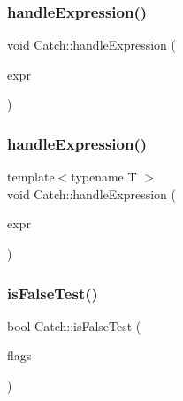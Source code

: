 \mbox{\label{namespace_catch_a65af25091f2ab61056e166765963e525}} 
\subsubsection{\texorpdfstring{handle\+Expression()}{handleExpression()}\hspace{0.1cm}{\footnotesize\ttfamily [1/2]}}
{\footnotesize\ttfamily void Catch\+::handle\+Expression (\begin{DoxyParamCaption}\item[{\mbox{\hyperlink{struct_catch_1_1_i_transient_expression}{I\+Transient\+Expression}} const \&}]{expr }\end{DoxyParamCaption})}

\mbox{\label{namespace_catch_af2c93db76668a981e75ae835699efce7}} 
\subsubsection{\texorpdfstring{handle\+Expression()}{handleExpression()}\hspace{0.1cm}{\footnotesize\ttfamily [2/2]}}
{\footnotesize\ttfamily template$<$typename T $>$ \\
void Catch\+::handle\+Expression (\begin{DoxyParamCaption}\item[{\mbox{\hyperlink{class_catch_1_1_expr_lhs}{Expr\+Lhs}}$<$ T $>$ const \&}]{expr }\end{DoxyParamCaption})}

\mbox{\label{namespace_catch_a93ef4e3e307a2021ca0d41b32c0e54b0}} 
\subsubsection{\texorpdfstring{is\+False\+Test()}{isFalseTest()}}
{\footnotesize\ttfamily bool Catch\+::is\+False\+Test (\begin{DoxyParamCaption}\item[{int}]{flags }\end{DoxyParamCaption})\hspace{0.3cm}{\ttfamily [inline]}}

